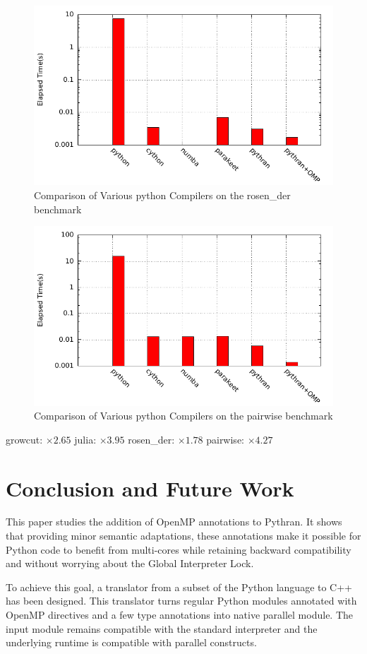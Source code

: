 \documentclass[conference]{IEEEtran}
\begin{document}
\begin{figure}[ht]
    \includegraphics[width=.5\textwidth]{rosen_der}
    \caption{Comparison of Various python Compilers on the rosen\_der benchmark}
    \label{fig:pb-rosen}
\end{figure}

\begin{figure}[ht]
    \includegraphics[width=.5\textwidth]{pairwise}
    \caption{Comparison of Various python Compilers on the pairwise benchmark}
    \label{fig:pb-pairwise}
\end{figure}
growcut: $\times 2.65$
julia: $\times 3.95$
rosen\_der: $\times 1.78$
pairwise: $\times 4.27$


\section{Conclusion and Future Work}

This paper studies the addition of OpenMP annotations to Pythran. It shows that
providing minor semantic adaptations, these annotations make it possible for
Python code to benefit from multi-cores while retaining backward compatibility
and without worrying about the Global Interpreter Lock.

To achieve this goal, a translator from a subset of the Python language to C++
has been designed. This translator turns regular Python modules annotated with
OpenMP directives and a few type annotations into native parallel module. The
input module remains compatible with the standard interpreter and the underlying
runtime is compatible with parallel constructs.
\end{document}
